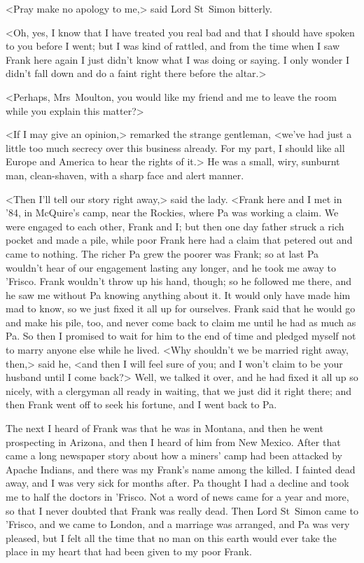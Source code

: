 <Pray make no apology to me,> said Lord St~Simon bitterly.

<Oh, yes, I know that I have treated you real bad and that I should have spoken to you before I went; but I was kind of rattled, and from the time when I saw Frank here again I just didn't know what I was doing or saying. I only wonder I didn't fall down and do a faint right there before the altar.>

<Perhaps, Mrs~Moulton, you would like my friend and me to leave the room while you explain this matter?>

<If I may give an opinion,> remarked the strange gentleman, <we've had just a little too much secrecy over this business already. For my part, I should like all Europe and America to hear the rights of it.> He was a small, wiry, sunburnt man, clean-shaven, with a sharp face and alert manner.

<Then I'll tell our story right away,> said the lady. <Frank here and I met in '84, in McQuire's camp, near the Rockies, where Pa was working a claim. We were engaged to each other, Frank and I; but then one day father struck a rich pocket and made a pile, while poor Frank here had a claim that petered out and came to nothing. The richer Pa grew the poorer was Frank; so at last Pa wouldn't hear of our engagement lasting any longer, and he took me away to 'Frisco. Frank wouldn't throw up his hand, though; so he followed me there, and he saw me without Pa knowing anything about it. It would only have made him mad to know, so we just fixed it all up for ourselves. Frank said that he would go and make his pile, too, and never come back to claim me until he had as much as Pa. So then I promised to wait for him to the end of time and pledged myself not to marry anyone else while he lived. <Why shouldn't we be married right away, then,> said he, <and then I will feel sure of you; and I won't claim to be your husband until I come back?> Well, we talked it over, and he had fixed it all up so nicely, with a clergyman all ready in waiting, that we just did it right there; and then Frank went off to seek his fortune, and I went back to Pa.

The next I heard of Frank was that he was in Montana, and then he went prospecting in Arizona, and then I heard of him from New Mexico. After that came a long newspaper story about how a miners' camp had been attacked by Apache Indians, and there was my Frank's name among the killed. I fainted dead away, and I was very sick for months after. Pa thought I had a decline and took me to half the doctors in 'Frisco. Not a word of news came for a year and more, so that I never doubted that Frank was really dead. Then Lord St~Simon came to 'Frisco, and we came to London, and a marriage was arranged, and Pa was very pleased, but I felt all the time that no man on this earth would ever take the place in my heart that had been given to my poor Frank.

